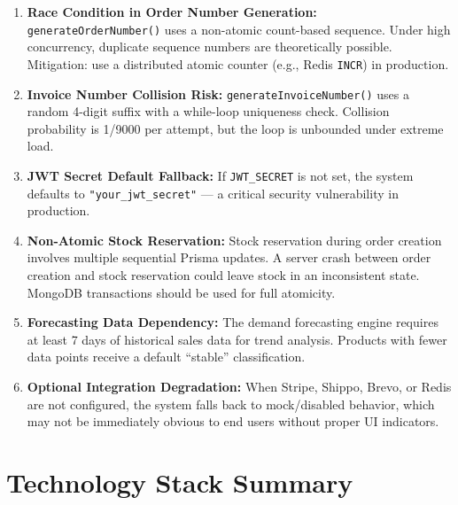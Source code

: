 ﻿\documentclass[12pt,a4paper]{report}
\begin{document}
\begin{tcolorbox}[warningbox,title={Known Issues and Technical Challenges}]
\begin{enumerate}[leftmargin=1.5em]
  \item \textbf{Race Condition in Order Number Generation:} \texttt{generateOrderNumber()} uses a non-atomic count-based sequence. Under high concurrency, duplicate sequence numbers are theoretically possible. Mitigation: use a distributed atomic counter (e.g., Redis \texttt{INCR}) in production.
  \item \textbf{Invoice Number Collision Risk:} \texttt{generateInvoiceNumber()} uses a random 4-digit suffix with a while-loop uniqueness check. Collision probability is 1/9000 per attempt, but the loop is unbounded under extreme load.
  \item \textbf{JWT Secret Default Fallback:} If \texttt{JWT\_SECRET} is not set, the system defaults to \texttt{"your\_jwt\_secret"} --- a critical security vulnerability in production.
  \item \textbf{Non-Atomic Stock Reservation:} Stock reservation during order creation involves multiple sequential Prisma updates. A server crash between order creation and stock reservation could leave stock in an inconsistent state. MongoDB transactions should be used for full atomicity.
  \item \textbf{Forecasting Data Dependency:} The demand forecasting engine requires at least 7 days of historical sales data for trend analysis. Products with fewer data points receive a default ``stable'' classification.
  \item \textbf{Optional Integration Degradation:} When Stripe, Shippo, Brevo, or Redis are not configured, the system falls back to mock/disabled behavior, which may not be immediately obvious to end users without proper UI indicators.
\end{enumerate}
\end{tcolorbox}

\section{Technology Stack Summary}
\end{document}
